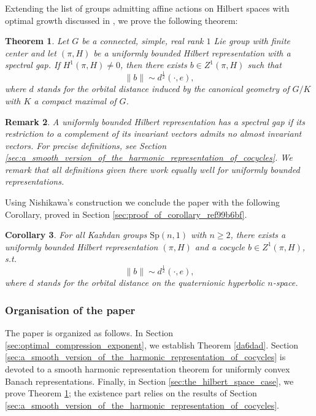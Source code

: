 \documentclass[12pt]{amsart}
\newtheorem{theorem}{Theorem}[section]
\newtheorem{corollary}[theorem]{Corollary}
\newtheorem{remark}[theorem]{Remark}
\theoremstyle{definition}
\begin{document}
Extending the list of groups admitting affine actions on Hilbert spaces with optimal growth discussed in \cite[Proposition~3.9]{Cornulier2007}, we prove
the following theorem:




\begin{theorem}
\label{6ea617}
Let \(G\) be a connected, simple, real rank \(1\) Lie group with finite
center and let \((\pi,H)\) be a uniformly bounded Hilbert representation
with a spectral gap. If \(H^1(\pi,H)\neq0\), then there exists
\(b \in Z^{1}(\pi,H)\) such that \[\|b\|\sim d^\frac{1}{2}(\cdot,e),\]
where \(d\) stands for the orbital distance induced by the canonical geometry of \(G/K\) with
\(K\) a compact maximal of \(G\).
\end{theorem}

\begin{remark}
A uniformly bounded Hilbert representation has a spectral gap if its
restriction to a complement of its invariant vectors admits no almost
invariant vectors. For precise definitions, see Section
\ref{sec:a_smooth_version_of_the_harmonic_representation_of_cocycles}.
We remark that all definitions given there work equally well for
uniformly bounded representations.
\end{remark}

Using Nishikawa's construction \cite{Nishikawa2020_preprint} we conclude
the paper with the following Corollary, proved in Section
\ref{sec:proof_of_corollary_ref99b6bf}.


\begin{corollary}
\label{99b6bf}
For all Kazhdan groups \(\mathrm{Sp}(n,1)\) with \(n\ge2\), there exists
a uniformly bounded Hilbert representation \((\pi,H)\) and a cocycle
\(b \in Z^{1}(\pi,H)\), s.t. \[\|b\|\sim d^\frac{1}{2}(\cdot,e),\] where
\(d\) stands for the orbital distance on the quaternionic hyperbolic
\(n\)-space.
\end{corollary}


\subsubsection{Organisation of the paper}
\label{sec:organisation_of_the_paper}

The paper is organized as follows. In Section
\ref{sec:optimal_compression_exponent}, we establish Theorem
\ref{da6dad}. Section
\ref{sec:a_smooth_version_of_the_harmonic_representation_of_cocycles} is
devoted to a smooth harmonic representation theorem for uniformly convex
Banach representations. Finally, in Section
\ref{sec:the_hilbert_space_case}, we prove Theorem \ref{6ea617}; the
existence part relies on the results of Section
\ref{sec:a_smooth_version_of_the_harmonic_representation_of_cocycles}.
\end{document}
